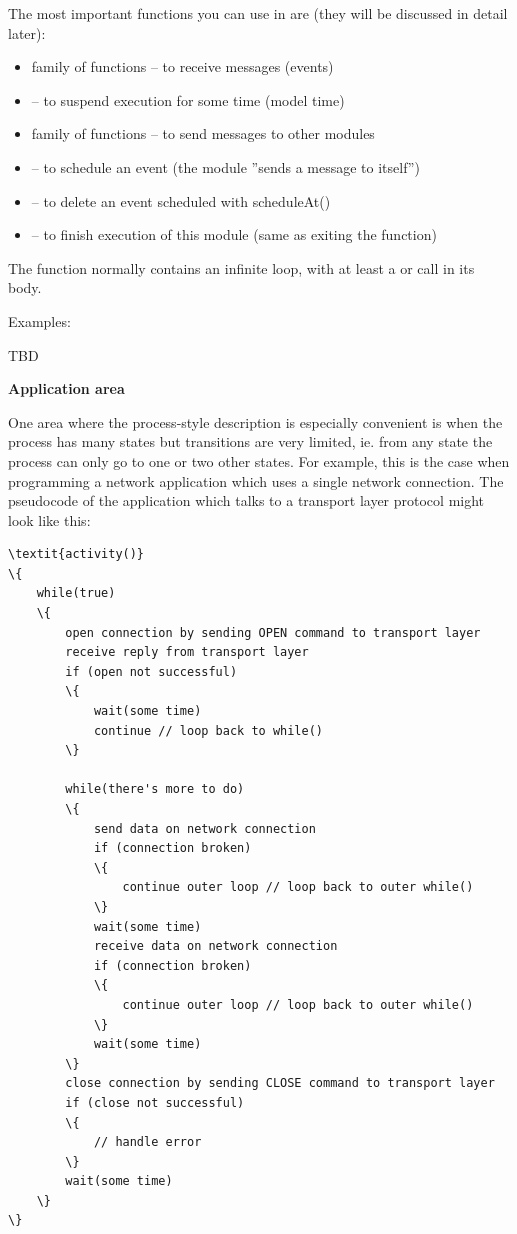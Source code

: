 The most important functions you can use in  are
(they will be discussed in detail later):
\begin{itemize}
\item{ family of functions -- to receive messages (events)}
\item{ -- to suspend execution
    for some time (model time)}
\item{ family of functions -- to send messages to other
    modules}
\item{ -- to schedule an event (the module ''sends
    a message to itself'')}
\item{ -- to delete an event scheduled with
    scheduleAt()}
\item{ -- to finish execution of this module (same as
    exiting the  function)}
\end{itemize}

The  function normally contains an infinite loop,
with at least a  or  call in its body.


Examples:


TBD


\textbf{Application area}


One area where the process-style description is especially convenient is when the process has many
states but transitions are very limited, ie. from any state the
process can only go to one or two other states.  For example, this is
the case when programming a network application which uses a single
network connection.  The pseudocode of the application which talks to
a transport layer protocol might look like this:

\begin{Verbatim}[commandchars=\\\{\}]
\textit{activity()}
\{
    while(true)
    \{
        open connection by sending OPEN command to transport layer
        receive reply from transport layer
        if (open not successful)
        \{
            wait(some time)
            continue // loop back to while()
        \}
        
        while(there's more to do)
        \{
            send data on network connection
            if (connection broken)
            \{
                continue outer loop // loop back to outer while()
            \}
            wait(some time)
            receive data on network connection
            if (connection broken)
            \{
                continue outer loop // loop back to outer while()
            \}
            wait(some time)
        \}
        close connection by sending CLOSE command to transport layer
        if (close not successful)
        \{
            // handle error
        \}
        wait(some time)
    \}
\}
\end{Verbatim}
  


